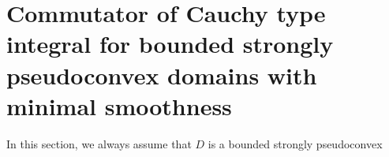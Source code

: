\documentclass[11pt,a4paper]{amsart}
\numberwithin{equation}{section}
\begin{document}

\section{Commutator of Cauchy type integral for bounded strongly pseudoconvex domains with minimal smoothness}
\setcounter{equation}{0}

In this section, we
always assume that $D$ is a bounded strongly pseudoconvex
\end{document}
